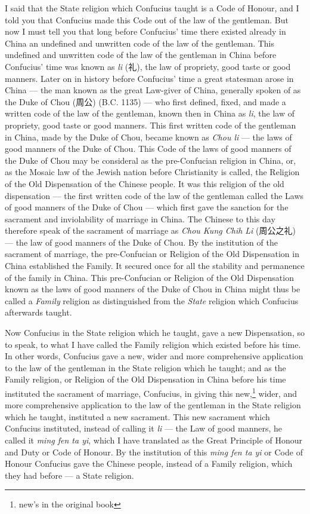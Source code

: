 I said that the State religion which Confucius taught is a Code of Honour, and I told you that Confucius made this Code out of the law of the gentleman.
But now I must tell you that long before Confucius' time there existed already in China an undefined and unwritten code of the law of the gentleman.
This undefined and unwritten code of the law of the gentleman in China before Confucius' time was known as \emph{li} (礼), the law of propriety, good taste or good manners.
Later on in history before Confucius' time a great statesman arose in China --- the man known as the great Law-giver of China, generally spoken of as the Duke of Chou (周公) (B.C. 1135) --- who first defined, fixed, and made a written code of the law of the gentleman, known then in China as \emph{li}, the law of propriety, good taste or good manners.
This first written code of the gentleman in China, made by the Duke of Chou, became known as \emph{Chou li} --- the laws of good manners of the Duke of Chou.
This Code of the laws of good manners of the Duke of Chou may be consideral as the pre-Confucian religion in China, or, as the Mosaic law of the Jewish nation before Christianity is called, the Religion of the Old Dispensation of the Chinese people.
It was this religion of the old dispensation --- the first written code of the law of the gentleman called the Laws of good manners of the Duke of Chou --- which first gave the sanction for the sacrament and inviolability of marriage in China.
The Chinese to this day therefore speak of the sacrament of marriage as {\em{Chou Kung Chih Li}} (周公之礼) --- the law of good manners of the Duke of Chou.
By the institution of the sacrament of marriage, the pre-Confucian or Religion of the Old Dispensation in China established the Family.
It secured once for all the stability and permanence of the family in China.
This pre-Confucian or Religion of the Old Dispensation known as the laws of good manners of the Duke of Chou in China might thus be called a \emph{Family} religion as distinguished from the \emph{State} religion which Confucius afterwards taught.

Now Confucius in the State religion which he taught, gave a new Dispensation, so to speak, to what I have called the Family religion which existed before his time.
In other words, Confucius gave a new, wider and more comprehensive application to the law of the gentleman in the State religion which he taught; and as the Family religion, or Religion of the Old Dispensation in China before his time instituted the sacrament of marriage, Confucius, in giving this new,\footnote{new's in the original book} wider, and more comprehensive application to the law of the gentleman in the State religion which he taught, instituted a new sacrament.
This new sacrament which Confucius instituted, instead of calling it \emph{li} --- the Law of good manners, he called it {\em{ming fen ta yi}}, which I have translated as the Great Principle of Honour and Duty or Code of Honour.
By the institution of this {\em{ming fen ta yi}} or Code of Honour Confucius gave the Chinese people, instead of a Family religion, which they had before --- a State religion.

